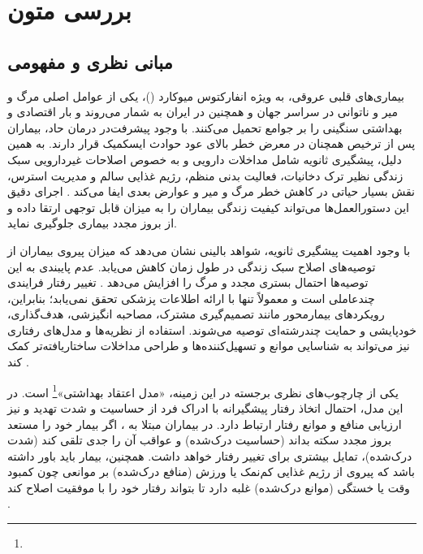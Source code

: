 \ChapterStart
\chapter{بررسی متون}
\label{ch:literature}


\section{مبانی نظری و مفهومی}
\label{sec:theoretical}

بیماری‌های قلبی عروقی، به ویژه انفارکتوس میوکارد ()، یکی از عوامل اصلی مرگ و میر و ناتوانی در سراسر جهان و همچنین در ایران به شمار می‌روند و بار اقتصادی و بهداشتی سنگینی را بر جوامع تحمیل می‌کنند\cite{GBD2021Causes2024,HeidariForoozan2025Iran}. با وجود پیشرفت‌در درمان‌ حاد، بیماران پس از ترخیص همچنان در معرض خطر بالای عود حوادث ایسکمیک قرار دارند. به همین دلیل، پیشگیری ثانویه شامل مداخلات دارویی و به خصوص اصلاحات غیردارویی سبک زندگی نظیر ترک دخانیات، فعالیت بدنی منظم، رژیم غذایی سالم و مدیریت استرس، نقش بسیار حیاتی در کاهش خطر مرگ و میر و عوارض بعدی ایفا می‌کند \cite{Byrne2023ESC}. اجرای دقیق این دستورالعمل‌ها می‌تواند کیفیت زندگی بیماران را به میزان قابل توجهی ارتقا داده و از بروز مجدد بیماری جلوگیری نماید\cite{Dibben2021CardiacRehabilitation}.

با وجود اهمیت پیشگیری ثانویه، شواهد بالینی نشان می‌دهد که میزان پیروی بیماران از توصیه‌های اصلاح سبک زندگی در طول زمان کاهش می‌یابد. عدم پایبندی به این توصیه‌ها احتمال بستری مجدد و مرگ را افزایش می‌دهد  \cite{Ek2019PhysicalInactivity}. تغییر رفتار فرایندی چندعاملی است و معمولاً تنها با ارائه اطلاعات پزشکی تحقق نمی‌یابد؛ بنابراین، رویکردهای بیمارمحور مانند تصمیم‌گیری مشترک، مصاحبه انگیزشی، هدف‌گذاری، خودپایشی و حمایت چندرشته‌ای توصیه می‌شوند. استفاده از نظریه‌ها و مدل‌های رفتاری نیز می‌تواند به شناسایی موانع و تسهیل‌کننده‌ها و طراحی مداخلات ساختاریافته‌تر کمک کند \cite{Visseren2021ESCPrevention}.

یکی از چارچوب‌های نظری برجسته در این زمینه، «مدل اعتقاد بهداشتی»\footnote{} است. در این مدل، احتمال اتخاذ رفتار پیشگیرانه با ادراک فرد از حساسیت و شدت تهدید و نیز ارزیابی منافع و موانع رفتار ارتباط دارد. در بیماران مبتلا به ، اگر بیمار خود را مستعد بروز مجدد سکته بداند (حساسیت درک‌شده) و عواقب آن را جدی تلقی کند (شدت درک‌شده)، تمایل بیشتری برای تغییر رفتار خواهد داشت. همچنین، بیمار باید باور داشته باشد که پیروی از رژیم غذایی کم‌نمک یا ورزش (منافع درک‌شده) بر موانعی چون کمبود وقت یا خستگی (موانع درک‌شده) غلبه دارد تا بتواند رفتار خود را با موفقیت اصلاح کند \cite{Sulat2018HBM}.

